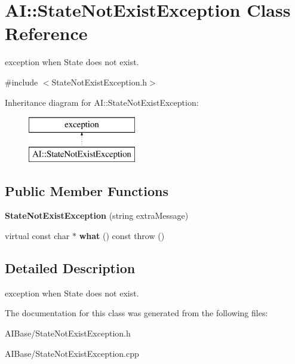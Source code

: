\hypertarget{classAI_1_1StateNotExistException}{\section{A\+I\+:\+:State\+Not\+Exist\+Exception Class Reference}
\label{classAI_1_1StateNotExistException}
}


exception when State does not exist.  




{\ttfamily \#include $<$State\+Not\+Exist\+Exception.\+h$>$}

Inheritance diagram for A\+I\+:\+:State\+Not\+Exist\+Exception\+:\begin{figure}[H]
\begin{center}
\leavevmode
\includegraphics[height=2.000000cm]{classAI_1_1StateNotExistException}
\end{center}
\end{figure}
\subsection*{Public Member Functions}
\begin{DoxyCompactItemize}
\item 
\hypertarget{classAI_1_1StateNotExistException_afba608702bcd8aeb728c3a6a1ff109c1}{{\bfseries State\+Not\+Exist\+Exception} (string extra\+Message)}\label{classAI_1_1StateNotExistException_afba608702bcd8aeb728c3a6a1ff109c1}

\item 
\hypertarget{classAI_1_1StateNotExistException_a97f180bdeef94eb9939bb80caa008951}{virtual const char $\ast$ {\bfseries what} () const   throw ()}\label{classAI_1_1StateNotExistException_a97f180bdeef94eb9939bb80caa008951}

\end{DoxyCompactItemize}


\subsection{Detailed Description}
exception when State does not exist. 



The documentation for this class was generated from the following files\+:\begin{DoxyCompactItemize}
\item 
A\+I\+Base/State\+Not\+Exist\+Exception.\+h\item 
A\+I\+Base/State\+Not\+Exist\+Exception.\+cpp\end{DoxyCompactItemize}
